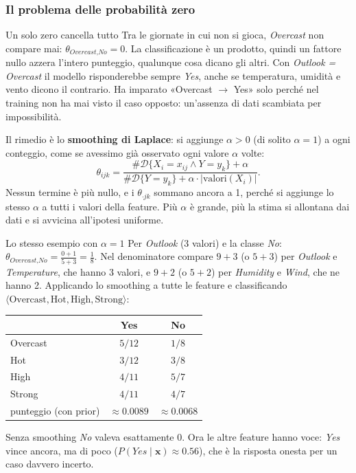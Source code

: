 \documentclass[12pt]{extarticle}
\begin{document}
\subsubsection{Il problema delle probabilità zero}

\begin{attenzionebox}{Un solo zero cancella tutto}
Tra le giornate in cui non si gioca, \textit{Overcast} non compare mai: $\theta_{\textit{Overcast},\textit{No}}=0$. La classificazione è un prodotto, quindi un fattore nullo azzera l'intero punteggio, qualunque cosa dicano gli altri. Con \textit{Outlook = Overcast} il modello risponderebbe sempre \textit{Yes}, anche se temperatura, umidità e vento dicono il contrario. Ha imparato «Overcast $\to$ Yes» solo perché nel training non ha mai visto il caso opposto: un'assenza di dati scambiata per impossibilità.
\end{attenzionebox}

\noindent Il rimedio è lo \textbf{smoothing di Laplace}: si aggiunge $\alpha>0$ (di solito $\alpha=1$) a ogni conteggio, come se avessimo già osservato ogni valore $\alpha$ volte:
\[
\theta_{ijk} = \frac{\#\mathcal{D}\{X_i=x_{ij}\land Y=y_k\}+\alpha}{\#\mathcal{D}\{Y=y_k\}+\alpha\cdot|\text{valori}(X_i)|} .
\]
Nessun termine è più nullo, e i $\theta_{\cdot jk}$ sommano ancora a 1, perché si aggiunge lo stesso $\alpha$ a tutti i valori della feature. Più $\alpha$ è grande, più la stima si allontana dai dati e si avvicina all'ipotesi uniforme.

\begin{esempiobox}{Lo stesso esempio con $\alpha=1$}
Per \textit{Outlook} (3 valori) e la classe \textit{No}: $\theta_{\textit{Overcast},\textit{No}}=\frac{0+1}{5+3}=\frac18$. Nel denominatore compare $9+3$ (o $5+3$) per \textit{Outlook} e \textit{Temperature}, che hanno 3 valori, e $9+2$ (o $5+2$) per \textit{Humidity} e \textit{Wind}, che ne hanno 2. Applicando lo smoothing a tutte le feature e classificando $\langle \text{Overcast}, \text{Hot}, \text{High}, \text{Strong} \rangle$:
\begin{center}
\small
\begin{tabular}{lcc}
    \toprule
    & \textbf{Yes} & \textbf{No} \\
    \midrule
    Overcast & $5/12$ & $1/8$ \\
    Hot & $3/12$ & $3/8$ \\
    High & $4/11$ & $5/7$ \\
    Strong & $4/11$ & $4/7$ \\
    \midrule
    punteggio (con prior) & $\approx 0.0089$ & $\approx 0.0068$ \\
    \bottomrule
\end{tabular}
\end{center}
Senza smoothing \textit{No} valeva esattamente 0. Ora le altre feature hanno voce: \textit{Yes} vince ancora, ma di poco ($P(\textit{Yes}\mid\mathbf{x})\approx 0.56$), che è la risposta onesta per un caso davvero incerto.
\end{esempiobox}
\end{document}
